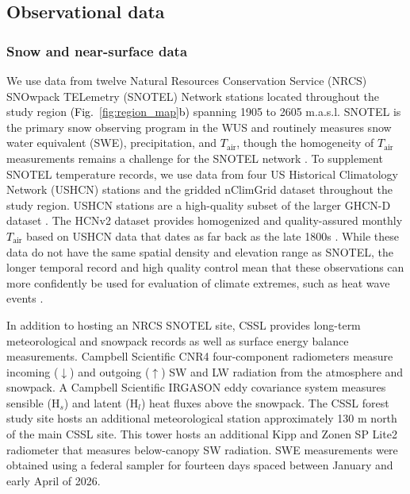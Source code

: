 \documentclass[draft]{agujournal2019}
\newcommand{\fig}[2]{\textcolor{black}{(Fig.~\ref{#1}{#2})}}   %
\newcommand{\tair}{\textcolor{black}{$T_{\mathrm{air}}$}\xspace}
\begin{document}
\subsection{Observational data}\label{sec:observational_data}
\subsubsection{Snow and near-surface data}
We use data from twelve Natural Resources Conservation Service (NRCS) SNOwpack TELemetry (SNOTEL) Network stations located throughout the study region \fig{fig:region_map}{b} spanning 1905 to 2605 m.a.s.l.
SNOTEL is the primary snow observing program in the WUS \cite{Serreze1999-as} and routinely measures snow water equivalent (SWE), precipitation, and \tair, though the homogeneity of \tair measurements remains a challenge for the SNOTEL network \cite{Oyler2015-by, McAfee2019-mt}.
To supplement SNOTEL temperature records, we use data from four US Historical Climatology Network (USHCN) stations and the gridded nClimGrid dataset \cite{Durre2022-be} throughout the study region.
USHCN stations are a high-quality subset of the larger GHCN-D dataset \cite{Menne2012-uu}.
The HCNv2 dataset provides homogenized and quality-assured monthly \tair based on USHCN data that dates as far back as the late 1800s \cite{Menne2009-ushcn}.
While these data do not have the same spatial density and elevation range as SNOTEL, the longer temporal record and high quality control mean that these observations can more confidently be used for evaluation of climate extremes, such as heat wave events \cite{BercosHickey2022}.

In addition to hosting an NRCS SNOTEL site, CSSL provides long-term meteorological and snowpack records as well as surface energy balance measurements.
Campbell Scientific CNR4 four-component radiometers measure incoming ($\downarrow$) and outgoing ($\uparrow$) SW and LW radiation from the atmosphere and snowpack.
A Campbell Scientific IRGASON eddy covariance system measures sensible (H$_s$) and latent (H$_l$) heat fluxes above the snowpack.
The CSSL forest study site hosts an additional meteorological station approximately 130 m north of the main CSSL site.
This tower hosts an additional Kipp and Zonen SP Lite2 radiometer that measures below-canopy SW radiation.
SWE measurements were obtained using a federal sampler \cite{Osterhuber2014-ic} for fourteen days spaced between January and early April of 2026. 
\end{document}
